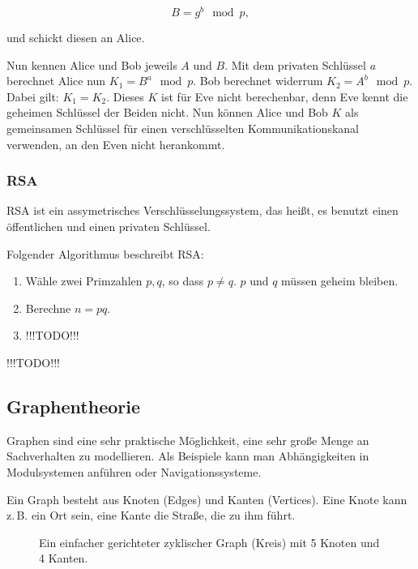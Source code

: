 \documentclass{scrartcl}
\newcommand{\TODO}{%
{\Huge\textcolor{HeavyRed}{\danger !!!TODO!!! \danger}}%
}
\begin{document}
\begin{equation}
	B = g^b \mod p,
\end{equation}

und schickt diesen an Alice.

Nun kennen Alice und Bob jeweils $A$ und $B$. Mit dem privaten Schlüssel $a$ berechnet
Alice nun $K_1 = B^a \mod p$. Bob berechnet widerrum $K_2 = A^b \mod p$. Dabei gilt:
$K_1 = K_2$. Dieses $K$ ist für Eve nicht berechenbar, denn Eve kennt die geheimen
Schlüssel der Beiden nicht. Nun können Alice und Bob $K$ als gemeinsamen Schlüssel
für einen verschlüsselten Kommunikationskanal verwenden, an den Even nicht herankommt.

\subsubsection{RSA}

RSA ist ein assymetrisches Verschlüsselungssystem, das heißt, es benutzt einen öffentlichen und einen privaten Schlüssel.

Folgender Algorithmus beschreibt RSA:

\begin{enumerate}
	\item Wähle zwei Primzahlen $p, q$, so dass $p \not= q$. $p$ und $q$ müssen geheim bleiben.
	\item Berechne $n = pq$.
	\item \TODO
\end{enumerate}

\TODO

\subsection{Graphentheorie}

Graphen sind eine sehr praktische Möglichkeit, eine sehr große Menge an Sachverhalten zu modellieren. Als Beispiele kann man Abhängigkeiten in 
Modulsystemen anführen oder Navigationssysteme.

Ein Graph besteht aus Knoten (Edges) und Kanten (Vertices). Eine Knote kann z.\,B. ein Ort sein, eine Kante die Straße, die zu ihm führt.

\begin{figure}[h!]
	\centering
	\caption{Ein einfacher gerichteter zyklischer Graph (Kreis) mit 5 Knoten und 4 Kanten.}
\end{figure}
\end{document}
